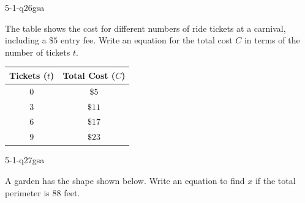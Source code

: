 \begin{practiceQuestion}{5-1-q26}{gsa}
\begin{questionText}
The table shows the cost for different numbers of ride tickets at a carnival, including a $\$5$ entry fee. Write an equation for the total cost $C$ in terms of the number of tickets $t$.

\begin{center}
\begin{tabular}{|c|c|}
\hline
\textbf{Tickets ($t$)} & \textbf{Total Cost ($C$)} \\
\hline
$0$ & $\$5$ \\
\hline
$3$ & $\$11$ \\
\hline
$6$ & $\$17$ \\
\hline
$9$ & $\$23$ \\
\hline
\end{tabular}
\end{center}
\end{questionText}
\end{practiceQuestion}

\begin{practiceQuestion}{5-1-q27}{gsa}
\begin{questionText}
A garden has the shape shown below. Write an equation to find $x$ if the total perimeter is $88$ feet.

\begin{center}
\end{center}
\end{questionText}
\end{practiceQuestion}
